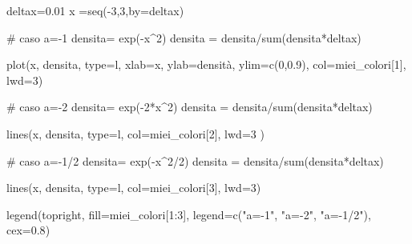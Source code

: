 \documentclass[
  italian,
  letterpaper,
]{book}
\newenvironment{Shaded}{\begin{snugshade}}{\end{snugshade}}
\newcommand{\AttributeTok}[1]{\textcolor[rgb]{0.40,0.45,0.13}{#1}}
\newcommand{\CommentTok}[1]{\textcolor[rgb]{0.37,0.37,0.37}{#1}}
\newcommand{\DecValTok}[1]{\textcolor[rgb]{0.68,0.00,0.00}{#1}}
\newcommand{\FloatTok}[1]{\textcolor[rgb]{0.68,0.00,0.00}{#1}}
\newcommand{\FunctionTok}[1]{\textcolor[rgb]{0.28,0.35,0.67}{#1}}
\newcommand{\NormalTok}[1]{\textcolor[rgb]{0.00,0.23,0.31}{#1}}
\newcommand{\OtherTok}[1]{\textcolor[rgb]{0.00,0.23,0.31}{#1}}
\newcommand{\SpecialCharTok}[1]{\textcolor[rgb]{0.37,0.37,0.37}{#1}}
\newcommand{\StringTok}[1]{\textcolor[rgb]{0.13,0.47,0.30}{#1}}
\theoremstyle{definition}
\theoremstyle{remark}
\begin{document}
\begin{Shaded}
\begin{Highlighting}[]
\NormalTok{deltax}\OtherTok{=}\FloatTok{0.01}
\NormalTok{x }\OtherTok{=}\FunctionTok{seq}\NormalTok{(}\SpecialCharTok{{-}}\DecValTok{3}\NormalTok{,}\DecValTok{3}\NormalTok{,}\AttributeTok{by=}\NormalTok{deltax)}

\CommentTok{\# caso a={-}1}
\NormalTok{densita}\OtherTok{=} \FunctionTok{exp}\NormalTok{(}\SpecialCharTok{{-}}\NormalTok{x}\SpecialCharTok{\^{}}\DecValTok{2}\NormalTok{)}
\NormalTok{densita }\OtherTok{=}\NormalTok{ densita}\SpecialCharTok{/}\FunctionTok{sum}\NormalTok{(densita}\SpecialCharTok{*}\NormalTok{deltax)}

\FunctionTok{plot}\NormalTok{(x, densita, }\AttributeTok{type=}\StringTok{\textquotesingle{}l\textquotesingle{}}\NormalTok{, }\AttributeTok{xlab=}\StringTok{\textquotesingle{}x\textquotesingle{}}\NormalTok{, }\AttributeTok{ylab=}\StringTok{\textquotesingle{}densità\textquotesingle{}}\NormalTok{, }\AttributeTok{ylim=}\FunctionTok{c}\NormalTok{(}\DecValTok{0}\NormalTok{,}\FloatTok{0.9}\NormalTok{), }\AttributeTok{col=}\NormalTok{miei\_colori[}\DecValTok{1}\NormalTok{], }\AttributeTok{lwd=}\DecValTok{3}\NormalTok{)}

\CommentTok{\# caso a={-}2}
\NormalTok{densita}\OtherTok{=} \FunctionTok{exp}\NormalTok{(}\SpecialCharTok{{-}}\DecValTok{2}\SpecialCharTok{*}\NormalTok{x}\SpecialCharTok{\^{}}\DecValTok{2}\NormalTok{)}
\NormalTok{densita }\OtherTok{=}\NormalTok{ densita}\SpecialCharTok{/}\FunctionTok{sum}\NormalTok{(densita}\SpecialCharTok{*}\NormalTok{deltax)}

\FunctionTok{lines}\NormalTok{(x, densita, }\AttributeTok{type=}\StringTok{\textquotesingle{}l\textquotesingle{}}\NormalTok{,  }\AttributeTok{col=}\NormalTok{miei\_colori[}\DecValTok{2}\NormalTok{], }\AttributeTok{lwd=}\DecValTok{3}\NormalTok{ )}


\CommentTok{\# caso a={-}1/2}
\NormalTok{densita}\OtherTok{=} \FunctionTok{exp}\NormalTok{(}\SpecialCharTok{{-}}\NormalTok{x}\SpecialCharTok{\^{}}\DecValTok{2}\SpecialCharTok{/}\DecValTok{2}\NormalTok{)}
\NormalTok{densita }\OtherTok{=}\NormalTok{ densita}\SpecialCharTok{/}\FunctionTok{sum}\NormalTok{(densita}\SpecialCharTok{*}\NormalTok{deltax)}

\FunctionTok{lines}\NormalTok{(x, densita, }\AttributeTok{type=}\StringTok{\textquotesingle{}l\textquotesingle{}}\NormalTok{,  }\AttributeTok{col=}\NormalTok{miei\_colori[}\DecValTok{3}\NormalTok{], }\AttributeTok{lwd=}\DecValTok{3}\NormalTok{)}

\FunctionTok{legend}\NormalTok{(}\StringTok{\textquotesingle{}topright\textquotesingle{}}\NormalTok{, }\AttributeTok{fill=}\NormalTok{miei\_colori[}\DecValTok{1}\SpecialCharTok{:}\DecValTok{3}\NormalTok{], }\AttributeTok{legend=}\FunctionTok{c}\NormalTok{(}\StringTok{"a={-}1"}\NormalTok{, }\StringTok{"a={-}2"}\NormalTok{, }\StringTok{"a={-}1/2"}\NormalTok{), }\AttributeTok{cex=}\FloatTok{0.8}\NormalTok{)}
\end{Highlighting}
\end{Shaded}
\end{document}

